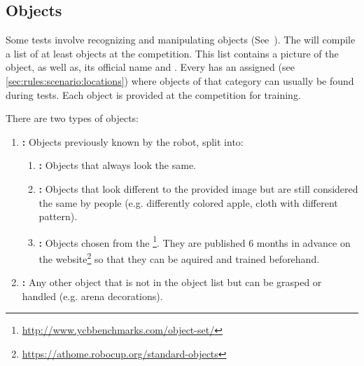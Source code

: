 \subsection{Objects}
\label{sec:rules:scenario:objects}
Some tests involve recognizing and manipulating objects (See~).
The \TC{} will compile a list of at least \NumObjects{} objects at the competition. This list contains a picture of the object, as well as, its official name and \ObjectCategory{}. Every \ObjectCategory{} has an assigned \PredefinedLocation{} (see \ref{sec:rules:scenario:locations}) where objects of that category can usually be found during tests.
Each object is provided at the competition for training.

There are two types of objects:

\begin{enumerate}
	\item \textbf{\KnownObjects{}:} Objects previously known by the robot, split into:
	\begin{enumerate}
		\item \textbf{\ConsistentObjects{}:} Objects that always look the same.
		\item \textbf{\SimilarObjects{}:} Objects that look different to the provided image but are still considered the same by people (e.g. differently colored apple, cloth with different pattern).
		\item \textbf{\StandardObjects{}:} Objects chosen from the \YCBData{}\footnote{\url{http://www.ycbbenchmarks.com/object-set/}}. They are published 6 months in advance on the \RoboCup\AtHome{} website\footnote{\url{https://athome.robocup.org/standard-objects}} so that they can be aquired and trained beforehand.
	\end{enumerate}

	\item \textbf{\UnknownObjects{}:} Any other object that is not in the object list but can be grasped or handled (e.g. arena decorations).
\end{enumerate}

